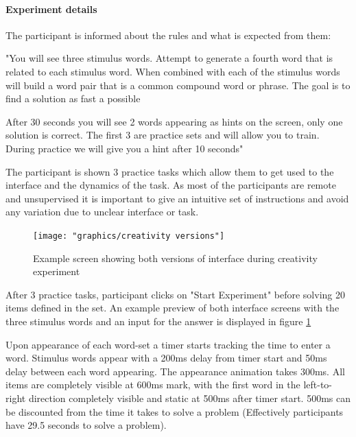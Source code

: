 		\paragraph{Experiment details}
		
		The participant is informed about the rules and what is expected from them:
		
		\begin{displayquote}
			"You will see three stimulus words. Attempt to generate a fourth word that is related to each stimulus word. When combined with each of the stimulus words will build a word pair that is a common compound word or phrase. The goal is to find a solution as fast a possible
			
			After 30 seconds you will see 2 words appearing as hints on the screen, only one solution is correct.
			The first 3 are practice sets and will allow you to train. During practice we will give you a hint after 10 seconds"
		\end{displayquote}
	
		The participant is shown 3 practice tasks which allow them to get used to the interface and the dynamics of the task. As most of the participants are remote and unsupervised it is important to give an intuitive set of instructions and avoid any variation due to unclear interface or task.
		
		\begin{figure}[h]
			\centering
			\texttt{[image: "graphics/creativity versions"]}
			\caption{Example screen showing both versions of interface during creativity experiment}
			\label{fig:creativity-versions}
		\end{figure}
	
		After 3 practice tasks, participant clicks on "Start Experiment" before solving 20 items defined in the set. An example preview of both interface screens with the three stimulus words and an input for the answer is displayed in figure \ref{fig:creativity-versions} 
		
		Upon appearance of each word-set a timer starts tracking the time to enter a word.
		Stimulus words appear with a 200ms delay from timer start and 50ms delay between each word appearing. The appearance animation takes 300ms. All items are completely visible at 600ms mark, with the first word in the left-to-right direction completely visible and static at 500ms after timer start. 500ms can be discounted from the time it takes to solve a problem (Effectively participants have 29.5 seconds to solve a problem).
		
